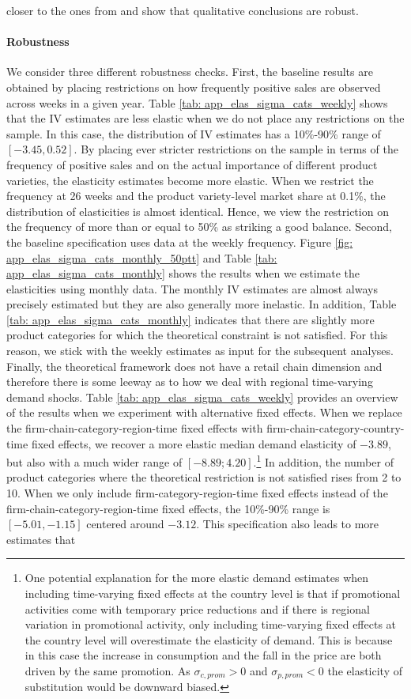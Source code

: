 closer to the ones from \citet{Hottman2016} and show that qualitative conclusions are robust.

\paragraph{Robustness}      We consider three different robustness checks. First, the baseline results are obtained by placing restrictions on how frequently positive sales are observed across weeks in a given year. Table \ref{tab: app_elas_sigma_cats_weekly} shows that the IV estimates are less elastic when we do not place any restrictions on the sample. In this case, the distribution of IV estimates has a 10\%-90\% range of $[-3.45,0.52]$. By placing ever stricter restrictions on the sample in terms of the frequency of positive sales and on the actual importance of different product varieties, the elasticity estimates become more elastic. When we restrict the frequency at 26 weeks and the product variety-level market share at 0.1\%, the distribution of elasticities is almost identical. Hence, we view the restriction on the frequency of more than or equal to 50\% as striking a good balance. Second, the baseline specification uses data at the weekly frequency. Figure \ref{fig: app_elas_sigma_cats_monthly_50ptt} and Table \ref{tab: app_elas_sigma_cats_monthly} shows the results when we estimate the elasticities using monthly data. The monthly IV estimates are almost always precisely estimated but they are also generally more inelastic. In addition, Table \ref{tab: app_elas_sigma_cats_monthly} indicates that there are slightly more product categories for which the theoretical constraint is not satisfied. For this reason, we stick with the weekly estimates as input for the subsequent analyses. Finally, the theoretical framework does not have a retail chain dimension and therefore there is some leeway as to how we deal with regional time-varying demand shocks. Table \ref{tab: app_elas_sigma_cats_weekly} provides an overview of the results when we experiment with alternative fixed effects. When we replace the firm-chain-category-region-time fixed effects with firm-chain-category-country-time fixed effects, we recover a more elastic median demand elasticity of $-3.89$, but also with a much wider range of $[-8.89;4.20]$.\footnote{One potential explanation for the more elastic demand estimates when including time-varying fixed effects at the country level is that if promotional activities come with temporary price reductions and if there is regional variation in promotional activity, only including time-varying fixed effects at the country level will overestimate the elasticity of demand. This is because in this case the increase in consumption and the fall in the price are both driven by the same promotion. As $\sigma_{c,prom} > 0$ and  $\sigma_{p,prom} < 0$ the elasticity of substitution would be downward biased.} In addition, the number of product categories where the theoretical restriction is not satisfied rises from 2 to 10. When we only include firm-category-region-time fixed effects instead of the firm-chain-category-region-time fixed effects, the 10\%-90\% range is $[-5.01,-1.15]$ centered around $-3.12$. This specification also leads to more estimates that 